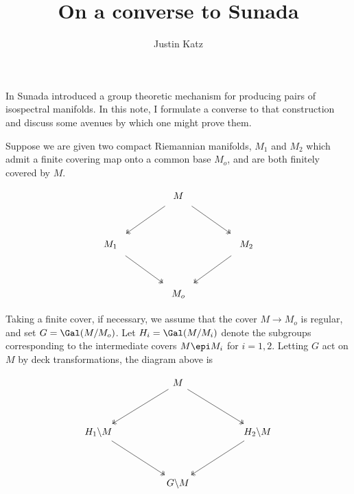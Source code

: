 \documentclass{amsart}
\title{On a converse to Sunada}
\author{Justin Katz}
\begin{document}
\maketitle 


In \cite{sunada1985} Sunada introduced a group theoretic mechanism for producing pairs of isospectral manifolds. In this note, I formulate a converse to that construction and discuss some avenues by which one might prove them.

Suppose we are given two compact Riemannian manifolds, $M_{1}$ and $M_{2}$ which admit a finite covering map onto a common base $M_{o}$, and are both finitely covered by $M$.

\[\begin{tikzcd}
	&& M \\
	\\
	{M_{1}} &&&& {M_{2}} \\
	\\
	&& M_{o}
	\arrow[shorten <=6pt, shorten >=6pt, two heads, from=3-1, to=5-3]
	\arrow[shorten <=6pt, shorten >=6pt, two heads, from=3-5, to=5-3]
	\arrow[shorten <=6pt, shorten >=6pt, two heads, from=1-3, to=3-1]
	\arrow[shorten <=6pt, shorten >=6pt, two heads, from=1-3, to=3-5]
\end{tikzcd}\]


Taking  a finite cover, if necessary, we assume that the cover $M \to M_{o}$ is regular, and set $G=\Gal(M/M_{o})$. Let $H_{i} = \Gal(M/M_i)$ denote the subgroups corresponding to the intermediate covers $M \epi M_i$ for $i=1,2$. Letting $G$ act on $M$ by deck transformations, the diagram above is

\[\begin{tikzcd}
	&& M \\
	\\
	{H_1 \backslash M} &&&& {H_2 \backslash M} \\
	\\
	&& {G\backslash M}
	\arrow[two heads, from=1-3, to=3-1]
	\arrow[two heads, from=1-3, to=3-5]
	\arrow[two heads, from=3-1, to=5-3]
	\arrow[two heads, from=3-5, to=5-3]
\end{tikzcd}\]





\end{document}
